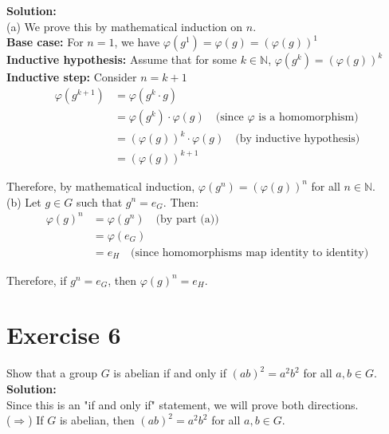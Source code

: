 \documentclass{article}
\begin{document}
\textbf{Solution:} \\

(a) We prove this by mathematical induction on $n$. \\

\textbf{Base case:} For $n = 1$, we have
$\varphi(g^1) = \varphi(g) = (\varphi(g))^1$ \\

\textbf{Inductive hypothesis:} Assume that for some $k \in \mathbb{N}$, 
$\varphi(g^k) = (\varphi(g))^k$ \\

\textbf{Inductive step:} Consider $n = k + 1$
\begin{align*}
\varphi(g^{k+1}) &= \varphi(g^k \cdot g) \\
&= \varphi(g^k) \cdot \varphi(g) \quad \text{(since $\varphi$ is a homomorphism)} \\
&= (\varphi(g))^k \cdot \varphi(g) \quad \text{(by inductive hypothesis)} \\
&= (\varphi(g))^{k+1}
\end{align*}

Therefore, by mathematical induction, $\varphi(g^n) = (\varphi(g))^n$ for all $n \in \mathbb{N}$. \\

(b) Let $g \in G$ such that $g^n = e_G$. Then:
\begin{align*}
\varphi(g)^n &= \varphi(g^n) \quad \text{(by part (a))} \\
&= \varphi(e_G) \\
&= e_H \quad \text{(since homomorphisms map identity to identity)}
\end{align*}

Therefore, if $g^n = e_G$, then $\varphi(g)^n = e_H$.
\newpage

\section*{Exercise 6}
Show that a group $G$ is abelian if and only if $(ab)^2 = a^2b^2$ for all $a,b \in G$. \\

\textbf{Solution:} \\

Since this is an "if and only if" statement, we will prove both directions. \\

($\Rightarrow$) If $G$ is abelian, then $(ab)^2 = a^2b^2$ for all $a,b \in G$. \\
\end{document}

